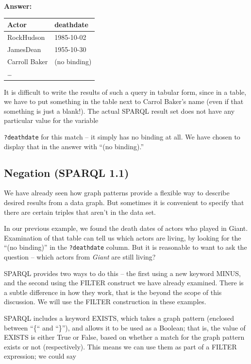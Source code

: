 \textbf{\textbf{Answer:}}

\begin{tabular}{|ll|}
\hline
Actor&deathdate\\
\hline
RockHudson&1985-10-02\\
JamesDean&1955-10-30\\
Carroll Baker&(no binding)\\
\ldots\\
\hline
\end{tabular}


It is difficult to write the results of such a query in tabular form,
since in a table, we have to put something in the table next to Carrol
Baker's name (even if that something is just a blank!). The actual
SPARQL result set does not have any particular value for the variable

\texttt{?deathdate} for this match -- it simply has no binding at all. We have
chosen to display that in the answer with ``(no binding).''

\subsection{Negation (SPARQL 1.1)}
\label{negation}

We have already seen how graph patterns provide a flexible way to
describe desired results from a data graph. But sometimes it is
convenient to specify that there are certain triples that aren't in the
data set.

In our previous example, we found the death dates of actors who played
in Giant. Examination of that table can tell us which actors are living,
by looking for the ``(no binding)'' in the \texttt{?deathdate} column. But it is
reasonable to want to ask the question -- which actors from \emph{Giant}
are still living?

SPARQL provides two ways to do this -- the first using a new keyword
MINUS, and the second using the FILTER construct we have already
examined. There is a subtle difference in how they work, that is the
beyond the scope of this discussion. We will use the FILTER construction
in these examples.

SPARQL includes a keyword EXISTS, which takes a graph pattern (enclosed
between ``\{`` and ``\}''), and allows it to be used as a Boolean; that
is, the value of EXISTS is either True or False, based on whether a
match for the graph pattern exists or not (respectively). This means we
can use them as part of a FILTER expression; we could say

